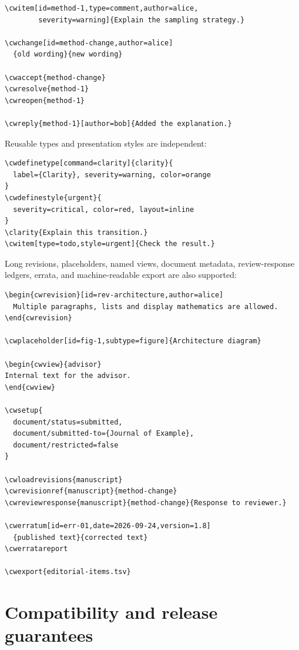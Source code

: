 \documentclass[11pt]{article}
\begin{document}
\begin{verbatim}
\cwitem[id=method-1,type=comment,author=alice,
        severity=warning]{Explain the sampling strategy.}

\cwchange[id=method-change,author=alice]
  {old wording}{new wording}

\cwaccept{method-change}
\cwresolve{method-1}
\cwreopen{method-1}

\cwreply{method-1}[author=bob]{Added the explanation.}
\end{verbatim}

Reusable types and presentation styles are independent:

\begin{verbatim}
\cwdefinetype[command=clarity]{clarity}{
  label={Clarity}, severity=warning, color=orange
}
\cwdefinestyle{urgent}{
  severity=critical, color=red, layout=inline
}
\clarity{Explain this transition.}
\cwitem[type=todo,style=urgent]{Check the result.}
\end{verbatim}

Long revisions, placeholders, named views, document metadata, review-response
ledgers, errata, and machine-readable export are also supported:

\begin{verbatim}
\begin{cwrevision}[id=rev-architecture,author=alice]
  Multiple paragraphs, lists and display mathematics are allowed.
\end{cwrevision}

\cwplaceholder[id=fig-1,subtype=figure]{Architecture diagram}

\begin{cwview}{advisor}
Internal text for the advisor.
\end{cwview}

\cwsetup{
  document/status=submitted,
  document/submitted-to={Journal of Example},
  document/restricted=false
}

\cwloadrevisions{manuscript}
\cwrevisionref{manuscript}{method-change}
\cwreviewresponse{manuscript}{method-change}{Response to reviewer.}

\cwerratum[id=err-01,date=2026-09-24,version=1.8]
  {published text}{corrected text}
\cwerratareport

\cwexport{editorial-items.tsv}
\end{verbatim}

\section*{Compatibility and release guarantees}
\end{document}
